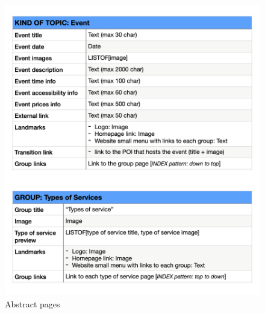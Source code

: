 \documentclass[table, 12pt]{article}
\begin{document}
\begin{figure}[H]
    \begin{center}
        \includegraphics[width=\textwidth]{assets/Tables/Abstract/abstractPage4.png}
        \caption{Abstract pages}
    \end{center}
\end{figure}
\end{document}

